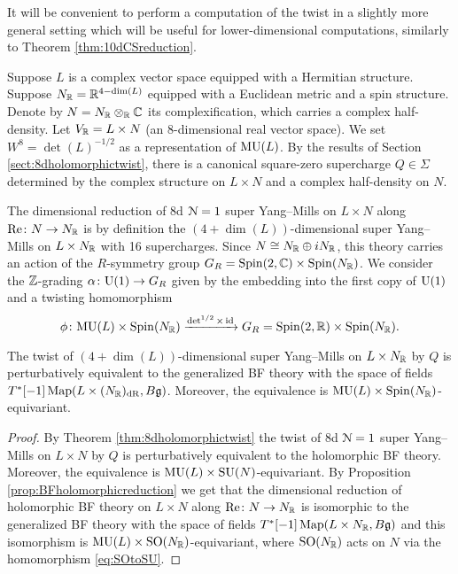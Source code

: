 \documentclass[10pt, oneside]{article}
\begin{document}
It will be convenient to perform a computation of the twist in a slightly more general setting which will be useful for lower-dimensional computations, similarly to Theorem \ref{thm:10dCSreduction}.

Suppose $L$ is a complex vector space equipped with a Hermitian structure. Suppose $N_\mathbb R=\mathbb R^{4-\dim(L)}$ equipped with a Euclidean metric and a spin structure. Denote by $N=N_\mathbb R\otimes_\mathbb R\mathbb C$ its complexification, which carries a complex half-density. Let $V_\mathbb R = L\times N$ (an 8-dimensional real vector space). We set $W^8=\det(L)^{-1/2}$ as a representation of $\mathrm{MU}(L)$. By the results of Section \ref{sect:8dholomorphictwist}, there is a canonical square-zero supercharge $Q\in\Sigma$ determined by the complex structure on $L\times N$ and a complex half-density on $N$.

The dimensional reduction of 8d $\mathcal N=1$ super Yang--Mills on $L\times N$ along $\mathrm{Re}\colon N\rightarrow N_\mathbb R$ is by definition the $(4+\dim(L))$-dimensional super Yang--Mills on $L\times N_\mathbb R$ with 16 supercharges. Since $N\cong N_\mathbb R\oplus iN_\mathbb R$, this theory carries an action of the $R$-symmetry group $G_R=\mathrm{Spin}(2, \mathbb C)\times \mathrm{Spin}(N_\mathbb R)$. We consider the $\mathbb Z$-grading $\alpha\colon \mathrm{U}(1)\rightarrow G_R$ given by the embedding into the first copy of $\mathrm{U}(1)$ and a twisting homomorphism
\[\phi\colon \mathrm{MU}(L)\times \mathrm{Spin}(N_\mathbb R)\xrightarrow{\det^{1/2}\times \operatorname{id}} G_R=\mathrm{Spin}(2, \mathbb R)\times \mathrm{Spin}(N_\mathbb R).\]

\begin{theorem}
The twist of $(4+\dim(L))$-dimensional super Yang--Mills on $L\times N_\mathbb R$ by $Q$ is perturbatively equivalent to the generalized BF theory with the space of fields $T^*[-1] \operatorname{Map}(L\times (N_\mathbb R)_{\mathrm{dR}}, B\mathfrak g)$. Moreover, the equivalence is $\mathrm{MU}(L)\times \mathrm{Spin}(N_\mathbb R)$-equivariant.
\label{thm:8dBFreduction}
\end{theorem}
\begin{proof}
By Theorem \ref{thm:8dholomorphictwist} the twist of 8d $\mathcal N=1$ super Yang--Mills on $L\times N$ by $Q$ is perturbatively equivalent to the holomorphic BF theory. Moreover, the equivalence is $\mathrm{MU}(L)\times \mathrm{SU}(N)$-equivariant. By Proposition \ref{prop:BFholomorphicreduction} we get that the dimensional reduction of holomorphic BF theory on $L\times N$ along $\mathrm{Re}\colon N\rightarrow N_\mathbb R$ is isomorphic to the generalized BF theory with the space of fields $T^*[-1]\operatorname{Map}(L\times N_\mathbb R, B\mathfrak g)$ and this isomorphism is $\mathrm{MU}(L)\times \mathrm{SO}(N_\mathbb R)$-equivariant, where $\mathrm{SO}(N_\mathbb R)$ acts on $N$ via the homomorphism \eqref{eq:SOtoSU}.
\end{proof}
\end{document}
